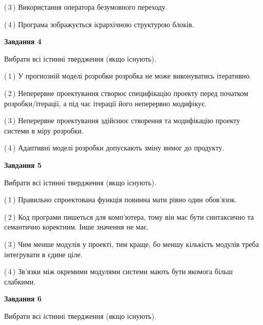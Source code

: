 \documentclass[10pt, ukrainian]{article}
\begin{document}
{\begin {large}
(\,3\,) Використання оператора безумовного переходу. %



(\,4\,) Програма зображується ієрархічною структурою блоків.%


{\begin {center}\textbf{Завдання 4}\end {center}}\par
Вибрати всі істинні твердження (якщо існують).\par
\vspace{2mm}



(\,1\,) У прогнозній моделі розробки розробка не може виконуватись ітеративно. %



(\,2\,) Неперервне проектування створює специфікацію проекту перед початком розробки/ітерації, а під час ітерації його неперервно модифікує.%



(\,3\,) Неперервне проектування здійснює створення та модифікацію проекту системи в міру розробки. %



(\,4\,) Адаптивні моделі розробки допускають зміну вимог до продукту. %


{\begin {center}\textbf{Завдання 5}\end {center}}\par
Вибрати всі істинні твердження (якщо існують).\par
\vspace{2mm}



(\,1\,) Правильно спроектована функція повинна мати рівно один обов'язок. %



(\,2\,) Код програми пишеться для комп'ютера, тому він має бути синтаксично та семантично коректним. Інше значення не має. %



(\,3\,) Чим менше модулів у проекті, тим краще, бо меншу кількість модулів треба інтегрувати в єдине ціле. %



(\,4\,) Зв'язки між окремими модулями системи мають бути якомога більш слабкими. %

\newpage

{\begin {center}\textbf{Завдання 6}\end {center}}\par
Вибрати всі істинні твердження (якщо існують).\par
\vspace{2mm}




\end{large}}
\end{document}
